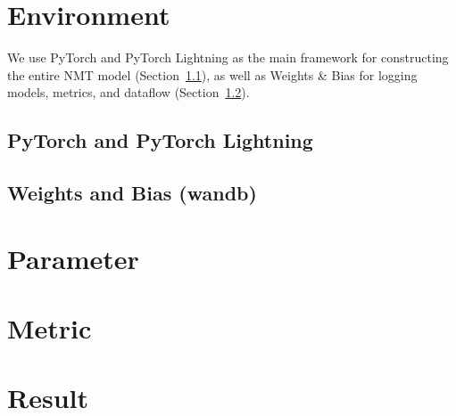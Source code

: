 \section{Environment} \label{sec:environment}

We use PyTorch and PyTorch Lightning as the main framework for constructing the entire NMT model (Section~\ref{sec:lightning}), as well as Weights \& Bias for logging models, metrics, and dataflow (Section~\ref{sec:wandb}).

\subsection{PyTorch and PyTorch Lightning} \label{sec:lightning}


\subsection{Weights and Bias (wandb)} \label{sec:wandb}


\section{Parameter} \label{sec:parameter}


\section{Metric} \label{sec:metric}


\section{Result} \label{sec:result}





